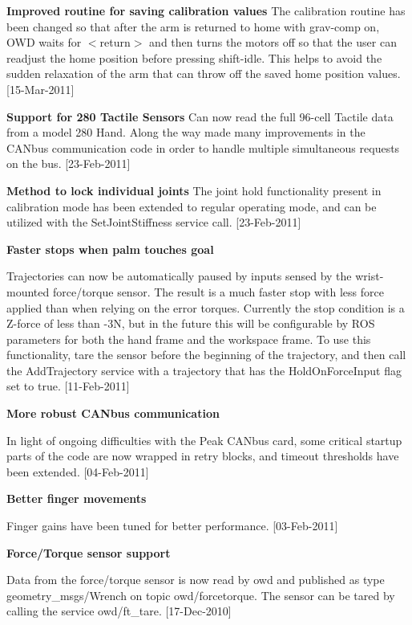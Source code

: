 {\bfseries Improved routine for saving calibration values} The calibration routine has been changed so that after the arm is returned to home with grav-\/comp on, O\-W\-D waits for $<$return$>$ and then turns the motors off so that the user can readjust the home position before pressing shift-\/idle. This helps to avoid the sudden relaxation of the arm that can throw off the saved home position values. \mbox{[}15-\/\-Mar-\/2011\mbox{]}

{\bfseries Support for 280 Tactile Sensors} Can now read the full 96-\/cell Tactile data from a model 280 Hand. Along the way made many improvements in the C\-A\-Nbus communication code in order to handle multiple simultaneous requests on the bus. \mbox{[}23-\/\-Feb-\/2011\mbox{]}

{\bfseries Method to lock individual joints} The joint hold functionality present in calibration mode has been extended to regular operating mode, and can be utilized with the Set\-Joint\-Stiffness service call. \mbox{[}23-\/\-Feb-\/2011\mbox{]}

{\bfseries Faster stops when palm touches goal}\par
 Trajectories can now be automatically paused by inputs sensed by the wrist-\/mounted force/torque sensor. The result is a much faster stop with less force applied than when relying on the error torques. Currently the stop condition is a Z-\/force of less than -\/3\-N, but in the future this will be configurable by R\-O\-S parameters for both the hand frame and the workspace frame. To use this functionality, tare the sensor before the beginning of the trajectory, and then call the Add\-Trajectory service with a trajectory that has the Hold\-On\-Force\-Input flag set to true. \mbox{[}11-\/\-Feb-\/2011\mbox{]}

{\bfseries More robust C\-A\-Nbus communication}\par
 In light of ongoing difficulties with the Peak C\-A\-Nbus card, some critical startup parts of the code are now wrapped in retry blocks, and timeout thresholds have been extended. \mbox{[}04-\/\-Feb-\/2011\mbox{]}

{\bfseries Better finger movements}\par
 Finger gains have been tuned for better performance. \mbox{[}03-\/\-Feb-\/2011\mbox{]}

{\bfseries Force/\-Torque sensor support}\par
 Data from the force/torque sensor is now read by owd and published as type geometry\-\_\-msgs/\-Wrench on topic owd/forcetorque. The sensor can be tared by calling the service owd/ft\-\_\-tare. \mbox{[}17-\/\-Dec-\/2010\mbox{]}

